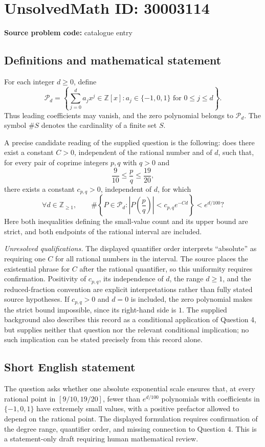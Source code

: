 \documentclass[11pt]{article}
\newcommand{\Z}{\mathbb{Z}}
\begin{document}
\section*{UnsolvedMath ID: 30003114}
\textbf{Source problem code:} catalogue entry
\subsection{Definitions and mathematical statement}
For each integer \(d\geq 0\), define
\[
\mathcal P_d=\left\{\sum_{j=0}^{d}a_jx^j\in\Z[x]:a_j\in\{-1,0,1\}\text{ for }0\leq j\leq d\right\}.
\]
Thus leading coefficients may vanish, and the zero polynomial belongs to \(\mathcal P_d\). The symbol \(\#S\) denotes the cardinality of a finite set \(S\).

A precise candidate reading of the supplied question is the following: does there exist a constant \(C>0\), independent of the rational number and of \(d\), such that, for every pair of coprime integers \(p,q\) with \(q>0\) and
\[
\frac{9}{10}\leq\frac pq\leq\frac{19}{20},
\]
there exists a constant \(c_{p,q}>0\), independent of \(d\), for which
\[
\forall d\in\Z_{\geq 1},\qquad
\#\left\{P\in\mathcal P_d:\left|P\!\left(\frac pq\right)\right|<c_{p,q}e^{-Cd}\right\}<e^{d/100}?
\]
Here both inequalities defining the small-value count and its upper bound are strict, and both endpoints of the rational interval are included.

\textit{Unresolved qualifications.} The displayed quantifier order interprets ``absolute'' as requiring one \(C\) for all rational numbers in the interval. The source places the existential phrase for \(C\) after the rational quantifier, so this uniformity requires confirmation. Positivity of \(c_{p,q}\), its independence of \(d\), the range \(d\geq1\), and the reduced-fraction convention are explicit interpretations rather than fully stated source hypotheses. If \(c_{p,q}>0\) and \(d=0\) is included, the zero polynomial makes the strict bound impossible, since its right-hand side is \(1\). The supplied background also describes this record as a conditional application of Question 4, but supplies neither that question nor the relevant conditional implication; no such implication can be stated precisely from this record alone.
\subsection{Short English statement}
The question asks whether one absolute exponential scale ensures that, at every rational point in \([9/10,19/20]\), fewer than \(e^{d/100}\) polynomials with coefficients in \(\{-1,0,1\}\) have extremely small values, with a positive prefactor allowed to depend on the rational point. The displayed formulation requires confirmation of the degree range, quantifier order, and missing connection to Question 4. This is a statement-only draft requiring human mathematical review.
\end{document}
